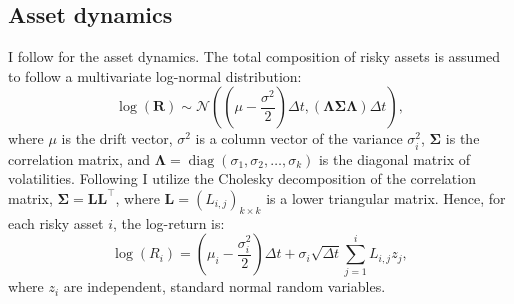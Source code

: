 \documentclass[11pt]{article}
\begin{document}
\subsection{Asset dynamics} \label{Subsection: Asset-dynamics}
I follow \textcite{CaiJuddXu2013} for the asset dynamics. The total composition of risky assets is assumed
to follow a multivariate log-normal distribution:
\begin{equation}\label{eq:Multivariate_Distribution}
   \log (\mathbf{R}) \sim \mathcal{N} \left( \left( \mu - \frac{\sigma^{2}}{2} \right) \Delta t , \left( \boldsymbol{\Lambda \Sigma \Lambda } \right) \Delta t \right),
\end{equation}
where \(\mu\) is the drift vector, \(\sigma^{2}\) is a column vector of the variance $\sigma^{2}_{i}$, \(\boldsymbol{\Sigma}\) is
the correlation matrix, and \(\boldsymbol{\Lambda} = \operatorname{diag}(\sigma_1 , \sigma_2 , \ldots , \sigma_k)\)
is the diagonal matrix of volatilities. Following \textcite{CaiJuddXu2013} I utilize the Cholesky decomposition of the correlation matrix,
\(\boldsymbol{\Sigma} = \mathbf{L} \mathbf{L}^\top\), where \(\mathbf{L} = (L_{i,j})_{k \times k}\) is a
lower triangular matrix. Hence, for each risky asset \(i\), the log-return is:
\begin{equation}\label{eq:Distribution_Single_Return}
  \log (R_i) = \left( \mu_i - \frac{\sigma_i^2}{2} \right) \Delta t + \sigma_i \sqrt{\Delta t} \sum_{j=1}^i L_{i,j} z_j,
\end{equation}
where \(z_i\) are independent, standard normal random variables.
\end{document}
